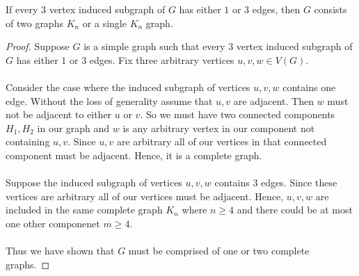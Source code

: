 \documentclass{article}
\newenvironment{claim}[2][Claim]{\begin{trivlist}
		\item[\hskip \labelsep {\bfseries #1}\hskip \labelsep {\bfseries #2}]}{\end{trivlist}}
\begin{document}
\begin{claim}{}
If every 3 vertex induced subgraph of $G$ has either $1$ or $3$ edges, then $G$ consists of two graphs $K_n$ or a single $K_n$ graph.
\end{claim}
\begin{proof}
Suppose $G$ is a simple graph such that every $3$ vertex induced subgraph of $G$ has either $1$ or $3$ edges. Fix three arbitrary vertices $u,v,w \in V(G)$. \\ \\
Consider the case where the induced subgraph of vertices $u,v,w$ contains one edge. Without the loss of generality assume that $u,v$ are adjacent. Then $w$ must not be adjacent to either $u$ or $v$. So we must have two connected components $H_1, H_2$ in our graph and $w$ is any arbitrary vertex in our component not containing $u,v$. Since $u,v$ are arbitrary all of our vertices in that connected component must be adjacent. Hence, it is a complete graph. \\ \\
Suppose the induced subgraph of vertices $u,v,w$ contains $3$ edges. Since these vertices are arbitrary all of our vertices must be adjacent. Hence, $u,v,w$ are included in the same complete graph $K_n$ where $n 
\geq 4$ and there could be at most one other componenet $m \geq 4$.
\\ \\ Thus we have shown that $G$ must be comprised of one or two complete graphs.
\end{proof}
\end{document}
